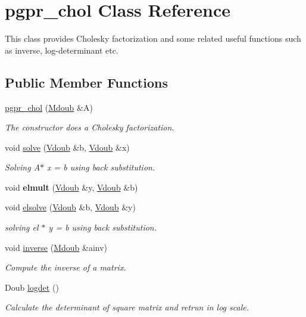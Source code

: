 \hypertarget{classpgpr__chol}{\section{pgpr\-\_\-chol Class Reference}
\label{classpgpr__chol}
}


This class provides Cholesky factorization and some related useful functions such as inverse, log-\/determinant etc.  


\subsection*{Public Member Functions}
\begin{DoxyCompactItemize}
\item 
\hyperlink{classpgpr__chol_ade89a39def082f6de79df242a39fad67}{pgpr\-\_\-chol} (\hyperlink{classpgpr__matrix}{Mdoub} \&A)
\begin{DoxyCompactList}\small\item\em The constructor does a Cholesky factorization. \end{DoxyCompactList}\item 
void \hyperlink{classpgpr__chol_a567b23e2e93a85675de26550d5e4cb38}{solve} (\hyperlink{classpgpr__vector}{Vdoub} \&b, \hyperlink{classpgpr__vector}{Vdoub} \&x)
\begin{DoxyCompactList}\small\item\em Solving A$\ast$ x = b using back substitution. \end{DoxyCompactList}\item 
\hypertarget{classpgpr__chol_aba5c1f9eb3157d703a3d2c2ccba83493}{void {\bfseries elmult} (\hyperlink{classpgpr__vector}{Vdoub} \&y, \hyperlink{classpgpr__vector}{Vdoub} \&b)}\label{classpgpr__chol_aba5c1f9eb3157d703a3d2c2ccba83493}

\item 
void \hyperlink{classpgpr__chol_a365839254c16b047b2e36a7937b8593f}{elsolve} (\hyperlink{classpgpr__vector}{Vdoub} \&b, \hyperlink{classpgpr__vector}{Vdoub} \&y)
\begin{DoxyCompactList}\small\item\em solving el $\ast$ y = b using back substitution. \end{DoxyCompactList}\item 
void \hyperlink{classpgpr__chol_a8da419135a59362c31674091b0bfcf89}{inverse} (\hyperlink{classpgpr__matrix}{Mdoub} \&ainv)
\begin{DoxyCompactList}\small\item\em Compute the inverse of a matrix. \end{DoxyCompactList}\item 
Doub \hyperlink{classpgpr__chol_a72827b33f276569fa6c3c8f2af80c40e}{logdet} ()
\begin{DoxyCompactList}\small\item\em Calculate the determinant of square matrix and retrun in log scale. \end{DoxyCompactList}\end{DoxyCompactItemize}


